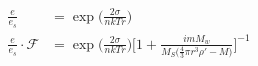 \documentclass[fleqn,10pt]{SelfArx} %
\begin{document}
\begin{align}
    \frac{e}{e_s} &= \exp\Big(\frac{2\sigma}{nkTr}\Big) \\
    \frac{e}{e_s}\cdot\mathcal{F} &= \exp\Big(\frac{2\sigma}{nkTr}\Big)\Big[1 + \frac{imM_w}{M_S\big(\frac{4}{3}\pi r^3 \rho' - M\big)}\Big]^{-1}
\end{align}

\clearpage
%     
%
%
%
%
%
%
%
\end{document}
